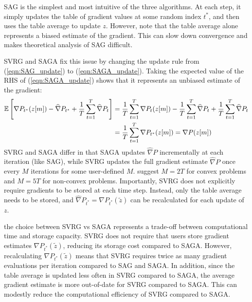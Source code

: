 SAG is the simplest and most intuitive of the three algorithms. At each step, it simply updates the table of gradient values at some random index $t^*$, and then uses the table average to update $z$. However, note that the table average alone represents a biased estimate of the gradient. This can slow down convergence and makes theoretical analysis of SAG difficult.

SVRG and SAGA fix this issue by changing the update rule from (\ref{eqn:SAG_update}) to (\ref{eqn:SAGA_update}). Taking the expected value of the RHS of (\ref{eqn:SAGA_update}) shows that it represents an unbiased estimate of the gradient:
%
\begin{align*}
    \mathbb{E}\left[\nabla P_{t^*}(z[m]) - \widehat \nabla P_{t^*} + \frac{1}{T} \sum_{t=1}^T \widehat \nabla P_{t} \right] &= \frac{1}{T} \sum_{t=1}^T \nabla P_{t}(z[m]) - \frac{1}{T} \sum_{t=1}^T \widehat \nabla P_{t} + \frac{1}{T} \sum_{t=1}^T \widehat \nabla P_{t} \\
    &= \frac{1}{T} \sum_{t=1}^T \nabla P_{t^*}(z[m]) = \nabla P(z[m])
\end{align*}
%
SVRG and SAGA differ in that SAGA updates $\widehat \nabla P$ incrementally at each iteration (like SAG), while SVRG updates the full gradient estimate $\widehat \nabla P$ once every $M$ iterations for some user-defined $M$. \citet{Johnson:2013} suggest $M = 2T$ for convex problems and $M = 5T$ for non-convex problems. Importantly, SVRG does not explicitly require gradients to be stored at each time step. Instead, only the table average needs to be stored, and $\widehat \nabla P_{t^*} = \nabla P_{t^*}(\tilde z)$ can be recalculated for each update of $z$. 

the choice between SVRG vs SAGA represents a trade-off between computational time and storage capacity. SVRG does not require that users store gradient estimates $\nabla P_{t^*}(\tilde z)$, reducing its storage cost compared to SAGA. However, recalculating $\nabla P_{t^*}(\tilde z)$ means that SVRG requires twice as many gradient evaluations per iteration compared to SAG and SAGA. In addition, since the table average is updated less often in SVRG compared to SAGA, the average gradient estimate is more out-of-date for SVRG compared to SAGA. This can modestly reduce the computational efficiency of SVRG compared to SAGA.
